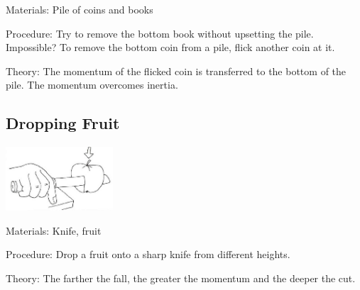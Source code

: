 \begin{multicols}{2}
\begin{description*}
\item[Materials:]{Pile of coins and books}
\item[Procedure:]{Try to remove the bottom book without upsetting the pile. Impossible? To remove the bottom coin from a pile, flick another coin at it.}
\item[Theory:]{The momentum of the flicked coin is transferred to the bottom of the pile. The momentum overcomes inertia.}
\end{description*}

\subsection{Dropping Fruit}

\begin{center}
\includegraphics[width=0.3\textwidth]{./img/vso/dropping-fruit.png}
\end{center}

\begin{description*}
\item[Materials:]{Knife, fruit}
\item[Procedure:]{Drop a fruit onto a sharp knife from different heights.}
\item[Theory:]{The farther the fall, the greater the momentum and the deeper the cut.}
\end{description*}


\end{multicols}
